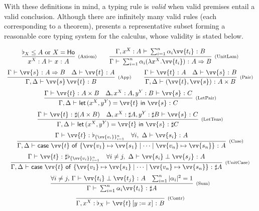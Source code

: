 \documentclass[runningheads,orivec,envcountsame,envcountsect]{llncs}
\newcommand\AbsBasis{\ensuremath{\mathsf{Ho}}}
\def\Pair#1#2{(#1,#2)} %
\def\Lam#1#2#3{\lambda#1^{#2}{.}#3} %
\def\letkeyword{\mathsf{let}}
\def\inkeyword{\mathsf{in}}
\def\LetP#1#2#3#4#5#6{\letkeyword\,\Pair{#1^{#2}}{#3^{#4}}=#5~\inkeyword~#6}
\def\gencase#1#2#3#4#5{\ensuremath{\mathsf{case}~#1~\mathsf{of}~\{#2\mapsto #4 \mid \dotsb \mid #3\mapsto #5\}}}
\def\Arr{\Rightarrow}
\def\TYP#1#2#3{#1~{\vdash}~#2~{:}~#3}
\def\SORTH#1#2#3#4{#1~{\vdash}~#2\perp#3~{:}~#4}
\def\snam#1{\textsc{\scriptsize\upshape(#1)}}
\newcommand\basis[1]{\ensuremath{\flat_{#1}}}
\newcommand\genbasis[3]{\ensuremath{\basis{\{#1\}_{#2}^{#3}}}}
\begin{document}
With these definitions in mind, a typing rule is \emph{valid} when valid
premises entail a valid conclusion.  
Although there are infinitely many valid rules (each corresponding to a theorem),
 presents a representative subset forming a reasonable
core typing system for the calculus, whose validity is stated below.

\begin{table}[t]
  \[
    \begin{array}{c}
      \infer[\snam{Axiom}]{\TYP{x^{X}:A}{x}{A}}{\basis{X}\leq A \text{ or }X=\AbsBasis}
      \qquad
	\infer[\snam{UnitLam}]{\TYP{\Gamma}{\sum_{i=1}^n \alpha_i (\Lam{x}{{X}}{\vv{t_i}})}{A\Arr B}}
	{\TYP{\Gamma,x^{X}:A}{\sum_{i=1}^{n}\alpha_i\vv{t_i}}{B}}
      \\
      \noalign{\medskip}
      \infer[\snam{App}]{\TYP{\Gamma,\Delta}{\vv{s}\,\vv{t}}{B}}
      {\TYP{\Gamma}{\vv{s}}{A\Arr B} & \TYP{\Delta}{\vv{t}}{A}}
      \qquad
      \infer[\snam{Pair}]{\TYP{\Gamma,\Delta}
      {\Pair{\vv{t}}{\vv{s}}}{A\times B}}{
	\TYP{\Gamma}{\vv{t}}{A}&\TYP{\Delta}{\vv{s}}{B}
      }
      \\
      \noalign{\medskip}
      \infer[\snam{LetPair}]{\TYP{\Gamma,\Delta} 
      {\LetP{x}{{X}}{y}{{Y}}{\vv{t}}{\vv{s}}}{C}}{
	\TYP{\Gamma}{\vv{t}}{A\times B}&
	\TYP{\Delta,x^{{X}}:A,y^{Y}:B}{\vv{s}}{C}
      }\\
      \noalign{\medskip}
      \infer[\snam{LetTens}]{\TYP{\Gamma,\Delta}
      {\LetP{x}{{X}}{y}{{Y}}{\vv{t}}{\vv{s}}}{\sharp C}}{
	\TYP{\Gamma}{\vv{t}}{\sharp(A\times B)}&
	\TYP{\Delta,x^{X}:\sharp A,y^{Y}:\sharp B}{\vv{s}}{C}
      }\\
      \noalign{\medskip}
      \infer[\snam{Case}]{\TYP{\Gamma,\Delta}
      {\gencase{\vv{t}}{\vv{v_1}}{\vv{v_n}}{\vv{s_1}}{\vv{s_n}}}{A}}{
	\TYP{\Gamma}{\vv{t}}{\genbasis{\vv{v_i}}{i=1}{n}}&
	\forall i,\ \TYP{\Delta}{\vv{s_i}}{A}
      }\\
      \noalign{\medskip}
      \infer[\snam{UnitCase}]{\TYP{\Gamma,\Delta}
      {\gencase{\vv{t}}{\vv{v_1}}{\vv{v_n}}{\vv{s_1}}{\vv{s_n}}}{\sharp A}}{
	\TYP{\Gamma}{\vv{t}}{\sharp \genbasis{\vv{v_i}}{i=1}{n}}&
	\forall i\neq j,\ \SORTH{\Delta}{\vv{s_i}}{\vv{s_j}}{A}
      }\\
      \noalign{\medskip}
      \infer[\snam{Sum}]
      {\TYP{\Gamma}{\sum_{i=1}^{n}\alpha_i \vv{t_i}}{\sharp A}}
      {\forall i\neq j,\, \SORTH{\Gamma}{\vv{t_i}}{\vv{t_j}}{A} &
      \sum_{i=1}^{n}|\alpha_i|^2 = 1}
      \\
      \noalign{\medskip}
      \infer[\snam{Contr}]{\TYP{\Gamma,x^{X}:{\basis{X}}}{\vv{t}\,[y:=x]}{B}}{
}
\end{array}\]
\end{table}
\end{document}
